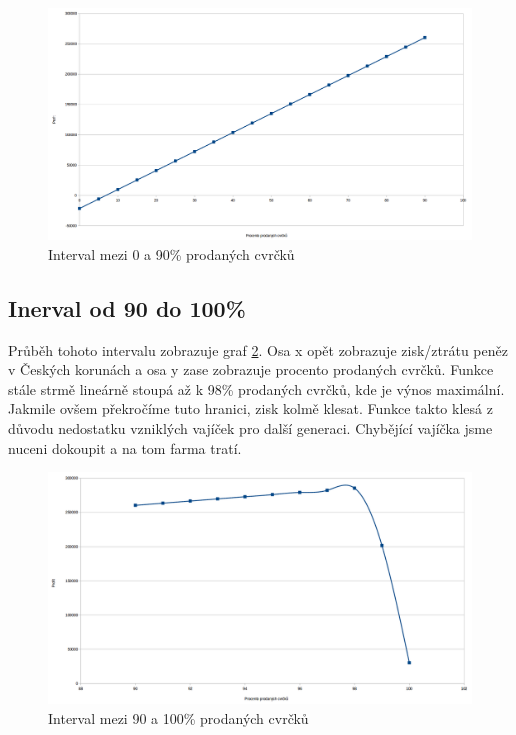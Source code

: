 \documentclass[a4paper, 12pt]{extarticle}
\begin{document}
\begin{figure}[h]
\includegraphics[width=\linewidth]{chart1.png}
\caption{Interval mezi 0 a 90\% prodaných cvrčků} \label{chart1}
\end{figure}

\newpage
\subsection{Inerval od 90 do 100{\%}}
Průběh tohoto intervalu zobrazuje graf \ref{chart2}. Osa x opět zobrazuje zisk/ztrátu peněz v Českých korunách a osa y zase zobrazuje procento prodaných cvrčků. Funkce stále strmě lineárně stoupá až k 98\% prodaných cvrčků, kde je výnos maximální. Jakmile ovšem překročíme tuto hranici, zisk kolmě klesat. Funkce takto klesá z důvodu nedostatku vzniklých vajíček pro další generaci. Chybějící vajíčka jsme nuceni dokoupit a na tom farma tratí.

\begin{figure}[h]
\includegraphics[width=\linewidth]{chart2.png}
\caption{Interval mezi 90 a 100\% prodaných cvrčků} \label{chart2}
\end{figure}
\end{document}
